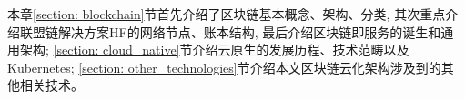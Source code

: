 本章\ref{section: blockchain}节首先介绍了区块链基本概念、架构、分类, 其次重点介绍联盟链解决方案HF的网络节点、账本结构, 最后介绍区块链即服务的诞生和通用架构; \ref{section: cloud_native}节介绍云原生的发展历程、技术范畴以及Kubernetes; \ref{section: other_technologies}节介绍本文区块链云化架构涉及到的其他相关技术。






